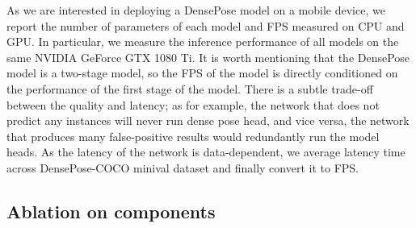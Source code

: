 As we are interested in deploying a DensePose model on a mobile device, we report the number of parameters of each model and FPS measured on CPU and GPU. In particular, we measure the inference performance of all models on the same NVIDIA GeForce GTX 1080 Ti. It is worth mentioning that the DensePose model is a two-stage model, so the FPS of the model is directly conditioned on the performance of the first stage of the model. There is a subtle trade-off between the quality and latency; as for example, the network that does not predict any instances will never run dense pose head, and vice versa, the network that produces many false-positive results would redundantly run the model heads. As the latency of the network is data-dependent, we average latency time across DensePose-COCO minival dataset and finally convert it to FPS.

\subsection{Ablation on components}

